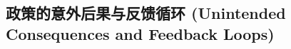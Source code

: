 \documentclass[master, final]{zufe-thesis}
\begin{document}


\subsection{政策的意外后果与反馈循环 (Unintended Consequences and Feedback Loops)}








\end{document}
